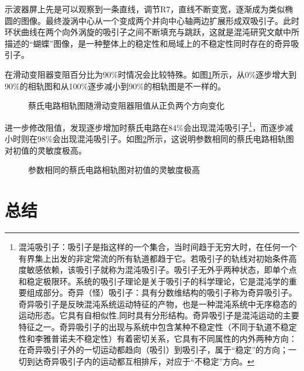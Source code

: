 \documentclass{article}
\begin{document}
\newpage

示波器屏上先是可以观察到一条直线，调节R7，直线不断变宽，逐渐成为类似椭圆的图像。最终漩涡中心从一个变成两个并向中心轴两边扩展形成双吸引子。此时环状曲线在两个向外涡旋的吸引子之间不断填充与跳跃，这就是混沌研究文献中所描述的“蝴蝶”图像，是一种整体上的稳定性和局域上的不稳定性同时存在的奇异吸引子。

在滑动变阻器变阻百分比为90\%时情况会比较特殊。如图\ref{fig:蔡氏电路相轨图随滑动变阻器阻值从正负两个方向变化}所示，从0\%逐步增大到90\%的相轨图和从100\%逐步减小到90\%的相轨图是不一样的。

\begin{figure}[htbp]
	\centering
	\quad
	\caption{蔡氏电路相轨图随滑动变阻器阻值从正负两个方向变化}
	\label{fig:蔡氏电路相轨图随滑动变阻器阻值从正负两个方向变化}
\end{figure}

进一步修改阻值，发现逐步增加时蔡氏电路在84\%会出现混沌吸引子\footnote{混沌吸引子：吸引子是指这样的一个集合，当时间趋于无穷大时，在任何一个有界集上出发的非定常流的所有轨道都趋于它。若吸引子的轨线对初始条件高度敏感依赖，该吸引子就称为混沌吸引子。吸引子无外乎两种状态，即单个点和稳定极限环。系统的吸引子理论是关于吸引子的科学理论，它是混沌学的重要组成部分。奇异（怪）吸引子：具有分数维结构的吸引子称为奇异吸引子。奇异吸引子是反映混沌系统运动特征的产物，也是一种混沌系统中无序稳态的运动形态。它具有自相似性,同时具有分形结构。奇异吸引子是混沌运动的主要特征之一。奇异吸引子的出现与系统中包含某种不稳定性（不同于轨道不稳定性和李雅普诺夫不稳定性）有着密切关系，它具有不同属性的内外两种方向：在奇异吸引子外的一切运动都趋向（吸引）到吸引子，属于“稳定”的方向；一切到达奇异吸引子内的运动都互相排斥，对应于“不稳定”方向。}，而逐步减小时则在98\%会出现混沌吸引子。如图\ref{fig:参数相同的蔡氏电路相轨图对初值的灵敏度极高}所示，这说明参数相同的蔡氏电路相轨图对初值的灵敏度极高。

\begin{figure}[htbp]
	\centering
	\quad

	\quad

	\quad
	\caption{参数相同的蔡氏电路相轨图对初值的灵敏度极高}
	\label{fig:参数相同的蔡氏电路相轨图对初值的灵敏度极高}
\end{figure}

\newpage

\section{总结}%
\label{sec:总结}
\end{document}
